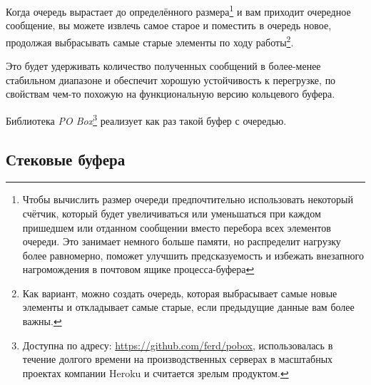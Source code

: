 \documentclass[11pt, oneside]{book}   	%
\begin{document}
Когда очередь вырастает до определённого размера\footnote{Чтобы вычислить размер очереди предпочтительно использовать некоторый счётчик, который будет увеличиваться или уменьшаться при каждом пришедшем или отданном сообщении вместо перебора всех элементов очереди. Это занимает немного больше памяти, но распределит нагрузку более равномерно, поможет улучшить предсказуемость и избежать внезапного нагромождения в почтовом ящике процесса-буфера} и вам приходит очередное сообщение, вы можете извлечь самое старое и поместить в очередь новое, продолжая выбрасывать самые старые элементы по ходу работы\footnote{Как вариант, можно создать очередь, которая выбрасывает самые новые элементы и откладывает самые старые, если предыдущие данные вам более важны.}.

Это будет удерживать количество полученных сообщений в более-менее стабильном диапазоне и обеспечит хорошую устойчивость к перегрузке, по свойствам чем-то похожую на функциональную версию кольцевого буфера.

Библиотека \emph{PO Box}\footnote{Доступна по адресу: \href{https://github.com/ferd/pobox}{https://github.com/ferd/pobox}, использовалась в течение долгого времени на производственных серверах в масштабных проектах компании Heroku и считается зрелым продуктом.} реализует как раз такой буфер с очередью.


\subsection{Стековые буфера}
\end{document}
